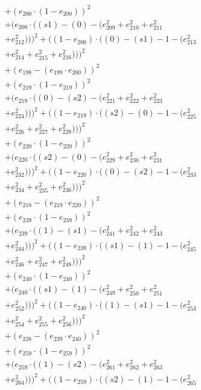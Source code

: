\documentclass[10pt, a4paper]{article}
\begin{document}
\begin{align*}
& + (e_{200}  \cdot  (1 - e_{200}))^{2} \\
& + (e_{200}  \cdot  ((s1) - (0) - (e_{209}^{2} + e_{210}^{2} + e_{211}^{2} \\
& + e_{212}^{2})))^{2} + ((1 - e_{200})  \cdot  ((0) - (s1) - 1 - (e_{213}^{2} \\
& + e_{214}^{2} + e_{215}^{2} + e_{216}^{2})))^{2} \\
& + (e_{198} - (e_{199}  \cdot  e_{200}))^{2} \\
& + (e_{219}  \cdot  (1 - e_{219}))^{2} \\
& + (e_{219}  \cdot  ((0) - (s2) - (e_{221}^{2} + e_{222}^{2} + e_{223}^{2} \\
& + e_{224}^{2})))^{2} + ((1 - e_{219})  \cdot  ((s2) - (0) - 1 - (e_{225}^{2} \\
& + e_{226}^{2} + e_{227}^{2} + e_{228}^{2})))^{2} \\
& + (e_{220}  \cdot  (1 - e_{220}))^{2} \\
& + (e_{220}  \cdot  ((s2) - (0) - (e_{229}^{2} + e_{230}^{2} + e_{231}^{2} \\
& + e_{232}^{2})))^{2} + ((1 - e_{220})  \cdot  ((0) - (s2) - 1 - (e_{233}^{2} \\
& + e_{234}^{2} + e_{235}^{2} + e_{236}^{2})))^{2} \\
& + (e_{218} - (e_{219}  \cdot  e_{220}))^{2} \\
& + (e_{239}  \cdot  (1 - e_{239}))^{2} \\
& + (e_{239}  \cdot  ((1) - (s1) - (e_{241}^{2} + e_{242}^{2} + e_{243}^{2} \\
& + e_{244}^{2})))^{2} + ((1 - e_{239})  \cdot  ((s1) - (1) - 1 - (e_{245}^{2} \\
& + e_{246}^{2} + e_{247}^{2} + e_{248}^{2})))^{2} \\
& + (e_{240}  \cdot  (1 - e_{240}))^{2} \\
& + (e_{240}  \cdot  ((s1) - (1) - (e_{249}^{2} + e_{250}^{2} + e_{251}^{2} \\
& + e_{252}^{2})))^{2} + ((1 - e_{240})  \cdot  ((1) - (s1) - 1 - (e_{253}^{2} \\
& + e_{254}^{2} + e_{255}^{2} + e_{256}^{2})))^{2} \\
& + (e_{238} - (e_{239}  \cdot  e_{240}))^{2} \\
& + (e_{259}  \cdot  (1 - e_{259}))^{2} \\
& + (e_{259}  \cdot  ((1) - (s2) - (e_{261}^{2} + e_{262}^{2} + e_{263}^{2} \\
& + e_{264}^{2})))^{2} + ((1 - e_{259})  \cdot  ((s2) - (1) - 1 - (e_{265}^{2} \\

\end{align*}
\end{document}
